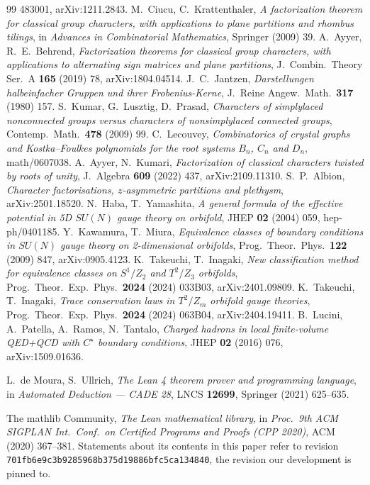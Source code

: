 \documentclass[11pt,a4paper]{article}
\begin{document}
\begin{thebibliography}{99}
483001, arXiv:1211.2843.
 M.~Ciucu, C.~Krattenthaler, \emph{A factorization theorem for classical group characters,
with applications to plane partitions and rhombus tilings}, in \emph{Advances in Combinatorial
Mathematics}, Springer (2009) 39.
 A.~Ayyer, R.~E.~Behrend, \emph{Factorization theorems for classical group characters,
with applications to alternating sign matrices and plane partitions}, J.\ Combin.\ Theory Ser.~A
\textbf{165} (2019) 78, arXiv:1804.04514.
 J.~C.~Jantzen, \emph{Darstellungen halbeinfacher Gruppen und ihrer
Frobenius-Kerne}, J.\ Reine Angew.\ Math.\ \textbf{317} (1980) 157.
 S.~Kumar, G.~Lusztig, D.~Prasad, \emph{Characters of simplylaced nonconnected groups
versus characters of nonsimplylaced connected groups}, Contemp.\ Math.\ \textbf{478} (2009) 99.
 C.~Lecouvey, \emph{Combinatorics of crystal graphs and Kostka--Foulkes polynomials
for the root systems $B_n$, $C_n$ and $D_n$}, math/0607038.
 A.~Ayyer, N.~Kumari, \emph{Factorization of classical characters twisted by roots of
unity}, J.\ Algebra \textbf{609} (2022) 437, arXiv:2109.11310.
 S.~P.~Albion, \emph{Character factorisations, $z$-asymmetric partitions and
plethysm}, arXiv:2501.18520.
 N.~Haba, T.~Yamashita, \emph{A general formula of the effective potential in 5D $SU(N)$
gauge theory on orbifold}, JHEP \textbf{02} (2004) 059, hep-ph/0401185.
 Y.~Kawamura, T.~Miura, \emph{Equivalence classes of boundary conditions in $SU(N)$ gauge
theory on 2-dimensional orbifolds}, Prog.\ Theor.\ Phys.\ \textbf{122} (2009) 847, arXiv:0905.4123.
 K.~Takeuchi, T.~Inagaki, \emph{New classification method for equivalence classes on
$S^1/Z_2$ and $T^2/Z_3$ orbifolds}, Prog.\ Theor.\ Exp.\ Phys.\ \textbf{2024} (2024) 033B03,
arXiv:2401.09809.
 K.~Takeuchi, T.~Inagaki, \emph{Trace conservation laws in $T^2/Z_m$ orbifold gauge
theories}, Prog.\ Theor.\ Exp.\ Phys.\ \textbf{2024} (2024) 063B04, arXiv:2404.19411.
 B.~Lucini, A.~Patella, A.~Ramos, N.~Tantalo, \emph{Charged hadrons in local finite-volume
QED+QCD with $C^\star$ boundary conditions}, JHEP \textbf{02} (2016) 076, arXiv:1509.01636.

 L.~de Moura, S.~Ullrich, \emph{The Lean 4 theorem prover and programming language},
in \emph{Automated Deduction --- CADE 28}, LNCS \textbf{12699}, Springer (2021) 625--635.

 The mathlib Community, \emph{The Lean mathematical library}, in \emph{Proc.\ 9th
ACM SIGPLAN Int.\ Conf.\ on Certified Programs and Proofs (CPP 2020)}, ACM (2020) 367--381.
Statements about its contents in this paper refer to revision
\texttt{701fb6e9c3b9285968b375d19886bfc5ca134840}, the revision our development is pinned to.
\end{thebibliography}
\end{document}
